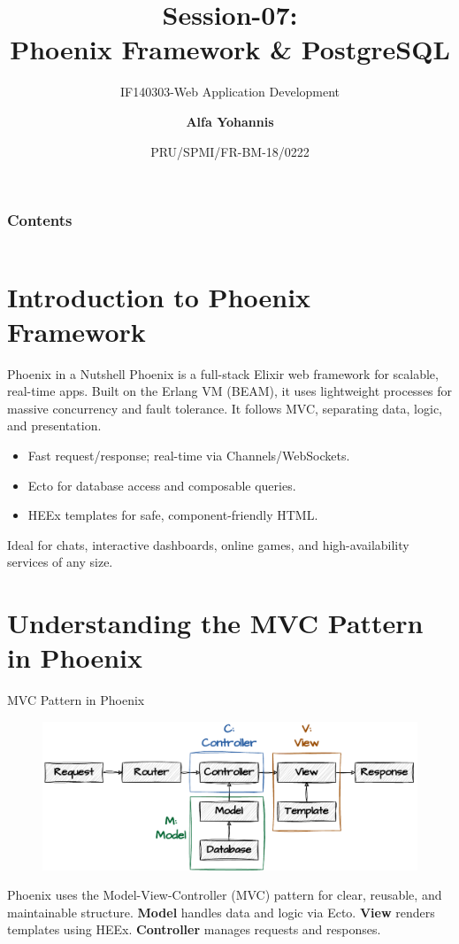\documentclass[aspectratio=169, table]{beamer}
\subtitle{IF140303-Web Application Development}
\title{Session-07:\\
\Huge{
Phoenix Framework \& PostgreSQL\\
\vspace{-20pt}
}
}
\date[Serial]{\scriptsize{PRU/SPMI/FR-BM-18/0222}}
\author[Pradita]{\small{\textbf{Alfa Yohannis}}}
\begin{document}
	
	\frame{\titlepage}
	
		\begin{frame}[fragile]
		\frametitle{Contents}
		\vspace{20pt}
		\begin{columns}[t]
			\tableofcontents[sections={1-6}]
			
			\tableofcontents[sections={7-99}]
		\end{columns}
	\end{frame}


\section{Introduction to Phoenix Framework}

\begin{frame}[fragile]{Phoenix in a Nutshell}
\vspace{20pt}
Phoenix is a full-stack Elixir web framework for scalable, real-time apps. Built on the Erlang VM (BEAM), it uses lightweight processes for massive concurrency and fault tolerance. It follows MVC, separating data, logic, and presentation.

\begin{itemize}
  \item Fast request/response; real-time via Channels/WebSockets.
  \item Ecto for database access and composable queries.
  \item HEEx templates for safe, component-friendly HTML.
\end{itemize}

Ideal for chats, interactive dashboards, online games, and high-availability services of any size.
\end{frame}

\section{Understanding the MVC Pattern in Phoenix}

\begin{frame}[fragile]{MVC Pattern in Phoenix}
\vspace*{20pt}

\begin{figure}[h]
  \centering
  \includegraphics[width=.8\textwidth]{../../assets/phoenix-mvc.pdf}
\end{figure}

Phoenix uses the Model-View-Controller (MVC) pattern for clear, reusable, and maintainable structure.  
\textbf{Model} handles data and logic via Ecto.  
\textbf{View} renders templates using HEEx.  
\textbf{Controller} manages requests and responses.

\end{frame}
\end{document}
